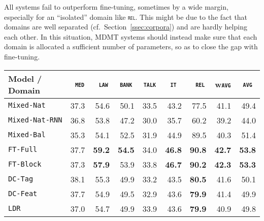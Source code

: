 \documentclass[11pt,a4paper]{article}
\newcommand{\fyDone}[1]{\done[FY]\Todo[FY:]{\textcolor{orange}{#1}}}
\newcommand{\domain}[1]{\texttt{\textsc{#1}}}
\newcommand{\system}[1]{\texttt{{#1}}}
\newcommand{\SB}[1]{\textbf{#1}}
\newcommand{\SW}[1]{\underline{#1}}
\begin{document}
All systems fail to outperform fine-tuning, sometimes by a wide margin, especially for an ``isolated'' domain like \domain{rel}. This might be due to the fact that domains are well separated (cf.\ Section~\ref{ssec:corpora}) and are hardly helping each other. In this situation, MDMT systems should instead make sure that each domain is allocated a sufficient number of parameters, so as to close the gap with fine-tuning.
\fyDone{More comments when we have all the results}\fyDone{Importance of sharing and unsharing}

\begin{table*}
  \centering
  \fyDone{Fix column size}
  \begin{tabular}{|p{3cm}|*{8}{r|}} \hline
    Model / Domain & \multicolumn{1}{c|}{\domain{ med}} & \multicolumn{1}{c|}{\domain{ law}} & \multicolumn{1}{c|}{\domain{bank}} & \multicolumn{1}{c|}{\domain{talk}} & \multicolumn{1}{c|}{\domain{ it }} & \multicolumn{1}{c|}{\domain{ rel}} & \multicolumn{1}{c|}{w\domain{avg}} & \multicolumn{1}{c|}{\domain{avg}} \\ \hline %
    \system{Mixed-Nat}  & 37.3 & 54.6 & 50.1 & 33.5 & 43.2 & 77.5  & 41.1  & 49.4 \\%
    \system{Mixed-Nat-RNN}  & 36.8 & 53.8 & 47.2 & 30.0 & 35.7 & 60.2  & 39.2  & 44.0 \\
    \system{Mixed-Bal}   &  35.3 & 54.1 & 52.5 & 31.9 & 44.9 & 89.5 & 40.3  & 51.4 \\ %
    \system{FT-Full}       & 37.7 & \SB{59.2} & \SB{54.5} & 34.0 & \SB{46.8} & \SB{90.8}   & \SB{42.7} & \SB{53.8} \\
   \system{FT-Block}     & 37.3 & \SB{57.9} & 53.9 & 33.8 & \SB{46.7} & \SB{90.2}  & \SB{42.3} & \SB{53.3} \\ \hline %
    \system{DC-Tag}       & 38.1 & 55.3 & 49.9   & 33.2 & 43.5 & \SB{80.5} &41.6 & 50.1    \\%
    \system{DC-Feat}      & 37.7  & 54.9 & 49.5   & 32.9 & 43.6 & \SB{79.9} &41.4 & 49.9   \\%
    \system{LDR}            & 37.0   & 54.7 & 49.9 & 33.9 & 43.6 & \SB{79.9} &40.9 & 49.8          \\%

\end{tabular}
\end{table*}
\end{document}
